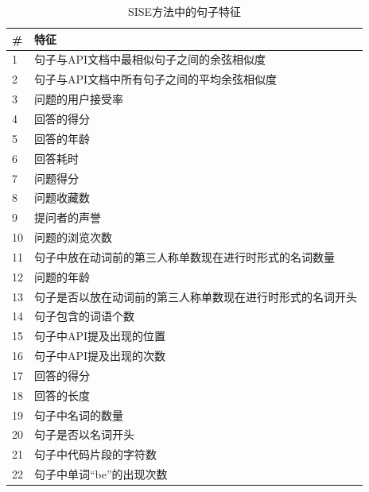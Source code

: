 \begin{table}[h]
    \centering
    \caption{SISE方法中的句子特征\cite{DBLP:conf/icse/TreudeR16}}
    \label{表2-3}
    \begin{tabular}{ll}
        \hline
        \# & 特征                            \\ \hline
        1  & 句子与API文档中最相似句子之间的余弦相似度        \\
        2  & 句子与API文档中所有句子之间的平均余弦相似度       \\
        3  & 问题的用户接受率                      \\
        4  & 回答的得分                         \\
        5  & 回答的年龄                         \\
        6  & 回答耗时                          \\
        7  & 问题得分                          \\
        8  & 问题收藏数                         \\
        9  & 提问者的声誉                        \\
        10 & 问题的浏览次数                       \\
        11 & 句子中放在动词前的第三人称单数现在进行时形式的名词数量   \\
        12 & 问题的年龄                         \\
        13 & 句子是否以放在动词前的第三人称单数现在进行时形式的名词开头 \\
        14 & 句子包含的词语个数                     \\
        15 & 句子中API提及出现的位置                 \\
        16 & 句子中API提及出现的次数                 \\
        17 & 回答的得分                         \\
        18 & 回答的长度                         \\
        19 & 句子中名词的数量                      \\
        20 & 句子是否以名词开头                     \\
        21 & 句子中代码片段的字符数                   \\
        22 & 句子中单词“be”的出现次数                \\ \hline
    \end{tabular}
\end{table}

